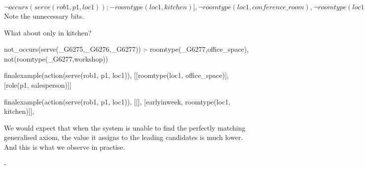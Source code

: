 $\neg occurs(serve(rob1, p1, loc1)) :- roomtype(loc1, kitchen)], 
     \neg roomtype(loc1, conference\_room), \neg roomtype(loc1, workshop)$
Note the unnecessary bits.

What about only in kitchen?

not_occurs(serve(_G6275,_G6276,_G6277)) :- roomtype(_G6277,office_space), not(roomtype(_G6277,workshop))

finalexample(action(serve(rob1, p1, loc1)), [[roomtype(loc1, office_space)], [role(p1, salesperson)]]

finalexample(action(serve(rob1, p1, loc1)), [[], [earlyinweek, roomtype(loc1, kitchen)]], 




We would expect that when the system is unable to find the perfectly matching generalised axiom, the value it assigns to the leading candidates is much lower. And this is what we observe in practise.


%




-



